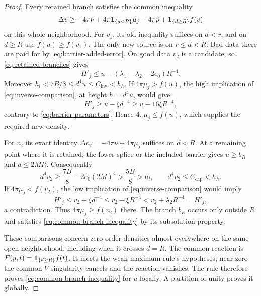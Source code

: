 \begin{proof}
Every retained branch satisfies the common inequality
\begin{equation}\label{eq:common-branch-inequality}
 \Delta v\ge-4\pi\nu+4\pi\mathbf 1_{\{d<R\}}\mu_j
       -4\pi\widetilde p+\mathbf 1_{\{d\ge R\}}f(v)
\end{equation}
on this whole neighborhood.  For $v_1$, its old inequality suffices
on $d<r$, and on $d\ge R$ use $f(u)\ge f(v_1)$.
The only new source is on $r\le d<R$.  Bad data there are paid for
by \cref{eq:barrier-added-error}.  On good data $v_2$ is a candidate,
so \cref{eq:retained-branches} gives
\[
 H'_j\le u-(\lambda_1-\lambda_2-2e_0)R^{-4}.
\]
Moreover $h_l<7B/8\le d^4u\le C_{\mathrm{inv}}<h_h$.
If $4\pi\mu_j>f(u)$, the high implication of
\cref{eq:inverse-comparison}, at height $h=d^4u$, would give
\[
 H'_j\ge u-\xi d^{-4}\ge u-16\xi R^{-4},
\]
contrary to \cref{eq:barrier-parameters}.  Hence $4\pi\mu_j\le f(u)$,
which supplies the required new density.

For $v_2$ its exact identity
$\Delta v_2=-4\pi\nu+4\pi\mu_j$ suffices on $d<R$.
At a remaining point where it is retained, the lower splice or
the included barrier gives $\widetilde u\ge b_R$ and $d\le2MR$.
Consequently
\[
 d^4v_2\ge\frac{7B}{8}-2e_0(2M)^4>\frac{5B}{8}>h_l,
 \qquad d^4v_2\le C_{\mathrm{cap}}<h_h.
\]
If $4\pi\mu_j<f(v_2)$, the low implication of
\cref{eq:inverse-comparison} would imply
\[
 H'_j\le v_2+\xi d^{-4}\le v_2+\xi R^{-4}
                <v_2+\lambda_2R^{-4}=H'_j,
\]
a contradiction.  Thus $4\pi\mu_j\ge f(v_2)$ there.  The branch
$b_R$ occurs only outside $R$ and satisfies
\cref{eq:common-branch-inequality} by its subsolution property.

These comparisons concern zero-order densities almost everywhere
on the same open neighborhood, including when it crosses $d=R$.
The common reaction is $F(y,t)=\mathbf 1_{\{d\ge R\}}f(t)$.
It meets the weak maximum rule's hypotheses; near zero the common
$V$ singularity cancels and the reaction vanishes.  The rule therefore
proves \cref{eq:common-branch-inequality} for $\widetilde u$ locally.
A partition of unity proves it globally.


\end{proof}
